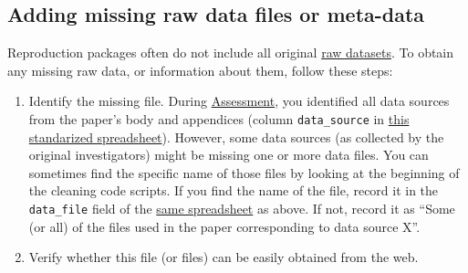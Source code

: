\documentclass[]{book}
\providecommand{\tightlist}{%
  \setlength{\itemsep}{0pt}\setlength{\parskip}{0pt}}
\begin{document}
\hypertarget{rd}{%
\subsection{Adding missing raw data files or meta-data}\label{rd}}

Reproduction packages often do not include all original \protect\hyperlink{describe-inputs}{raw datasets}. To obtain any missing raw data, or information about them, follow these steps:

\begin{enumerate}
\def\labelenumi{\arabic{enumi}.}
\tightlist
\item
  Identify the missing file. During \protect\hyperlink{assessment}{Assessment}, you identified all data sources from the paper's body and appendices (column \texttt{data\_source} in \href{https://docs.google.com/spreadsheets/d/1LUIdVFH0OfR70C7z07TYeE-uWzKI_JIeWUMaYhqEKK0/edit\#gid=0\&range=A1}{this standarized spreadsheet}). However, some data sources (as collected by the original investigators) might be missing one or more data files. You can sometimes find the specific name of those files by looking at the beginning of the cleaning code scripts. If you find the name of the file, record it in the \texttt{data\_file} field of the \href{https://docs.google.com/spreadsheets/d/1LUIdVFH0OfR70C7z07TYeE-uWzKI_JIeWUMaYhqEKK0/edit\#gid=0\&range=A1}{same spreadsheet} as above. If not, record it as ``Some (or all) of the files used in the paper corresponding to data source X''.\\
\item
  Verify whether this file (or files) can be easily obtained from the web.


\end{enumerate}
\end{document}
